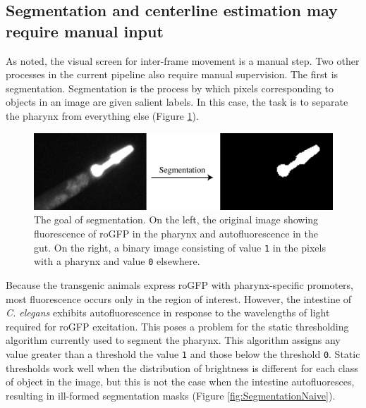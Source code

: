 \subsection{Segmentation and centerline estimation may require manual input} \label{limitationManual}

As noted, the visual screen for inter-frame movement is a manual step. Two other processes in the current pipeline also require manual supervision. The first is segmentation. Segmentation is the process by which pixels corresponding to objects in an image are given salient labels. In this case, the task is to separate the pharynx from everything else (Figure \ref{fig:SegmentationExample}). 

\begin{figure}[ht]
    \centering
    \includegraphics[scale=.25]{Figures/rendered_files/segmentation_description}
    \decoRule
    \caption[Segmentation of a fluorescence image]{The goal of segmentation. On the left, the original image showing fluorescence of roGFP in the pharynx and autofluorescence in the gut. On the right, a binary image consisting of value \texttt{1} in the pixels with a pharynx and value \texttt{0} elsewhere.}
    \label{fig:SegmentationExample}
\end{figure}

Because the transgenic animals express roGFP with pharynx-specific promoters, most fluorescence occurs only in the region of interest. However, the intestine of \textit{C. elegans} exhibits autofluorescence in response to the wavelengths of light required for roGFP excitation. This poses a problem for the static thresholding algorithm currently used to segment the pharynx. This algorithm assigns any value greater than a threshold the value \texttt{1} and those below the threshold \texttt{0}. Static thresholds work well when the distribution of brightness is different for each class of object in the image, but this is not the case when the intestine autofluoresces, resulting in ill-formed segmentation masks (Figure \ref{fig:SegmentationNaive}).


